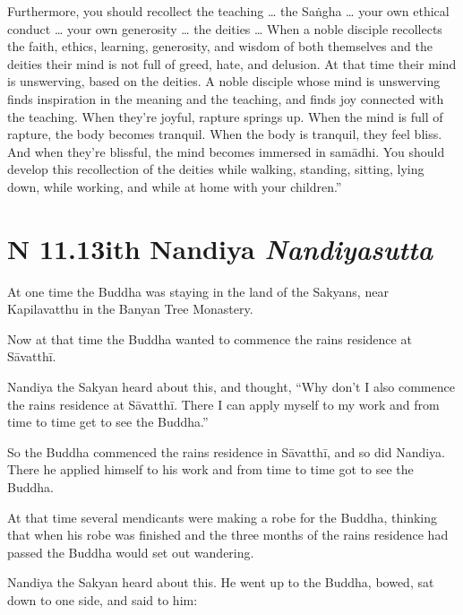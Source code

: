 \documentclass[12pt,openany]{book}%
\newcommand*{\suttatitleacronym}[1]{\smaller[2]{#1}\vspace*{.3em}}
\newcommand*{\suttatitletranslation}[1]{\linebreak{#1}}
\newcommand*{\suttatitleroot}[1]{\linebreak\smaller[2]\itshape{#1}}
\newcommand*{\tocacronym}[1]{\hspace*{-3.3em}{#1}\quad}
\newcommand*{\toctranslation}[1]{#1}
\newcommand*{\tocroot}[1]{(\textit{#1})}
\begin{document}
Furthermore, you should recollect the teaching … the \textsanskrit{Saṅgha} … your own ethical conduct … your own generosity … the deities … When a noble disciple recollects the faith, ethics, learning, generosity, and wisdom of both themselves and the deities their mind is not full of greed, hate, and delusion. At that time their mind is unswerving, based on the deities. A noble disciple whose mind is unswerving finds inspiration in the meaning and the teaching, and finds joy connected with the teaching. When they’re joyful, rapture springs up. When the mind is full of rapture, the body becomes tranquil. When the body is tranquil, they feel bliss. And when they’re blissful, the mind becomes immersed in \textsanskrit{samādhi}. You should develop this recollection of the deities while walking, standing, sitting, lying down, while working, and while at home with your children.” 

%
\section*{{\suttatitleacronym AN 11.13}{\suttatitletranslation With Nandiya }{\suttatitleroot Nandiyasutta}}
\addcontentsline{toc}{section}{\tocacronym{AN 11.13} \toctranslation{With Nandiya } \tocroot{Nandiyasutta}}

At one time the Buddha was staying in the land of the Sakyans, near Kapilavatthu in the Banyan Tree Monastery. 

Now at that time the Buddha wanted to commence the rains residence at \textsanskrit{Sāvatthī}. 

Nandiya the Sakyan heard about this, and thought, “Why don’t I also commence the rains residence at \textsanskrit{Sāvatthī}. There I can apply myself to my work and from time to time get to see the Buddha.” 

So the Buddha commenced the rains residence in \textsanskrit{Sāvatthī}, and so did Nandiya. There he applied himself to his work and from time to time got to see the Buddha. 

At that time several mendicants were making a robe for the Buddha, thinking that when his robe was finished and the three months of the rains residence had passed the Buddha would set out wandering. 

Nandiya the Sakyan heard about this. He went up to the Buddha, bowed, sat down to one side, and said to him: 
\end{document}
